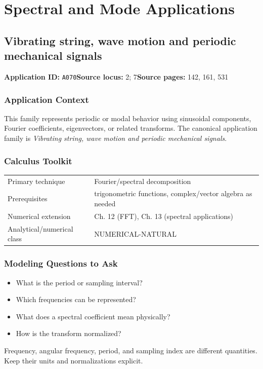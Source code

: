 \documentclass[11pt]{book}
\newcommand{\pid}[1]{\texttt{#1}}
\begin{document}
\part{Spectral and Mode Applications}
\chapter{Vibrating string, wave motion and periodic mechanical signals}\label{app:A070}
\textbf{Application ID:} \pid{A070}\quad \textbf{Source locus:} 2; 7\quad \textbf{Source pages:} 142, 161, 531
\section*{Application Context}
This family represents periodic or modal behavior using sinusoidal components, Fourier coefficients, eigenvectors, or related transforms. The canonical application family is \emph{Vibrating string, wave motion and periodic mechanical signals}.
\section*{Calculus Toolkit}
\begin{tabularx}{\textwidth}{@{}lX@{}}\toprule
Primary technique & Fourier/spectral decomposition \\
Prerequisites & trigonometric functions, complex/vector algebra as needed \\
Numerical extension & Ch. 12 (FFT), Ch. 13 (spectral applications) \\
Analytical/numerical class & NUMERICAL-NATURAL \\
\bottomrule\end{tabularx}
\section*{Modeling Questions to Ask}\begin{itemize}
\item What is the period or sampling interval?
\item Which frequencies can be represented?
\item What does a spectral coefficient mean physically?
\item How is the transform normalized?
\end{itemize}
\begin{errorbox}Frequency, angular frequency, period, and sampling index are different quantities. Keep their units and normalizations explicit.\end{errorbox}
\end{document}
